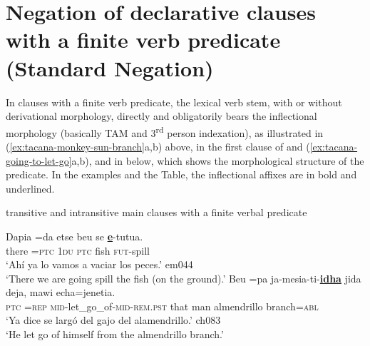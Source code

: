\documentclass[output=paper]{langsci/langscibook}
\begin{document}
\section{Negation of declarative clauses with a finite verb predicate (Standard Negation)}\label{sec:tacana-3}

In clauses with a finite verb predicate, the lexical verb stem,
with or without derivational morphology, directly and obligatorily bears
the inflectional morphology (basically TAM and 3\textsuperscript{rd} person
indexation), as illustrated in (\ref{ex:tacana-monkey-sun-branch}a,b)
above, in the first clause of  and
(\ref{ex:tacana-going-to-let-go}a,b), and in  below, which shows the morphological structure of the predicate. In the examples and the Table, the inflectional affixes are in bold and underlined.

\begin{exe}\ex\label{ex:tacana-going-to-let-go}  transitive and intransitive main clauses with a finite verbal predicate
\begin{xlist}
\ex\label{ex:tacana-going-to-spill}
 \gll Dapia  =da  etse  beu se \textbf{\uline{e}}-tutua.\\
there  =\textsc{ptc}  1\textsc{du}  \textsc{ptc}  fish
\textsc{fut}-spill\\
\glt `Ahí ya lo vamos a vaciar los peces.' em044\\
`There we are going spill the fish (on the ground).'
\ex\label{ex:tacana-let-go}
 \gll Beu  =pa ja-mesia-ti-\textbf{\uline{idha}}
 jida deja, mawi echa=jenetia.\\
    \textsc{ptc}  =\textsc{rep}
    \textsc{mid}-let\_go\_of-\textsc{mid-rem.pst}  that  man almendrillo
    branch=\textsc{abl}\\
\glt `Ya dice se largó del gajo del alamendrillo.' ch083\\
`He let go of himself from the almendrillo branch.'
\end{xlist}\end{exe}
\end{document}
